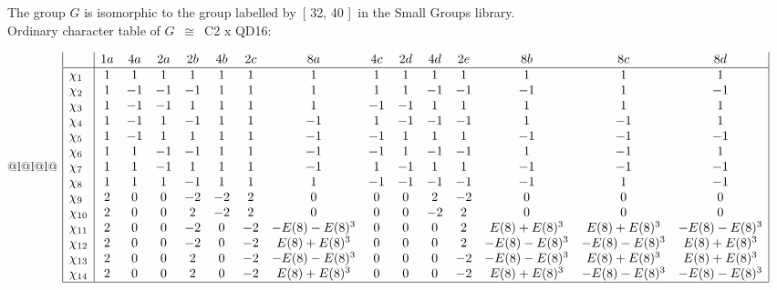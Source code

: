 \documentclass[varwidth=\maxdimen,border=10]{standalone}
\begin{document}
The group $G$ is isomorphic to the group labelled by\ [ 32, 40 ]\ in the Small Groups library.\\
Ordinary character table of $G$\ $\cong$\ C2 x QD16:\\
\begin{center}
\begin{tabular}{@{}l@{}l@{}l@{}}
\hline
\(\begin{array}{|l|cccccccccccccc|}
  & 1a & 4a & 2a & 2b & 4b & 2c & 8a & 4c & 2d & 4d & 2e & 8b & 8c & 8d\\ \hline
\chi_{1} & 1 & 1 & 1 & 1 & 1 & 1 & 1 & 1 & 1 & 1 & 1 & 1 & 1 & 1\\
\chi_{2} & 1 & -1 & -1 & -1 & 1 & 1 & 1 & 1 & 1 & -1 & -1 & -1 & 1 & -1\\
\chi_{3} & 1 & -1 & -1 & 1 & 1 & 1 & 1 & -1 & -1 & 1 & 1 & 1 & 1 & 1\\
\chi_{4} & 1 & -1 & 1 & -1 & 1 & 1 & -1 & 1 & -1 & -1 & -1 & 1 & -1 & 1\\
\chi_{5} & 1 & -1 & 1 & 1 & 1 & 1 & -1 & -1 & 1 & 1 & 1 & -1 & -1 & -1\\
\chi_{6} & 1 & 1 & -1 & -1 & 1 & 1 & -1 & -1 & 1 & -1 & -1 & 1 & -1 & 1\\
\chi_{7} & 1 & 1 & -1 & 1 & 1 & 1 & -1 & 1 & -1 & 1 & 1 & -1 & -1 & -1\\
\chi_{8} & 1 & 1 & 1 & -1 & 1 & 1 & 1 & -1 & -1 & -1 & -1 & -1 & 1 & -1\\
\chi_{9} & 2 & 0 & 0 & -2 & -2 & 2 & 0 & 0 & 0 & 2 & -2 & 0 & 0 & 0\\
\chi_{10} & 2 & 0 & 0 & 2 & -2 & 2 & 0 & 0 & 0 & -2 & 2 & 0 & 0 & 0\\
\chi_{11} & 2 & 0 & 0 & -2 & 0 & -2 & -E(8)-E(8)^{3} & 0 & 0 & 0 & 2 & E(8)+E(8)^{3} & E(8)+E(8)^{3} & -E(8)-E(8)^{3}\\
\chi_{12} & 2 & 0 & 0 & -2 & 0 & -2 & E(8)+E(8)^{3} & 0 & 0 & 0 & 2 & -E(8)-E(8)^{3} & -E(8)-E(8)^{3} & E(8)+E(8)^{3}\\
\chi_{13} & 2 & 0 & 0 & 2 & 0 & -2 & -E(8)-E(8)^{3} & 0 & 0 & 0 & -2 & -E(8)-E(8)^{3} & E(8)+E(8)^{3} & E(8)+E(8)^{3}\\
\chi_{14} & 2 & 0 & 0 & 2 & 0 & -2 & E(8)+E(8)^{3} & 0 & 0 & 0 & -2 & E(8)+E(8)^{3} & -E(8)-E(8)^{3} & -E(8)-E(8)^{3}\\
\hline
\end{array}\)\\
\end{tabular}
\end{center}
\end{document}
